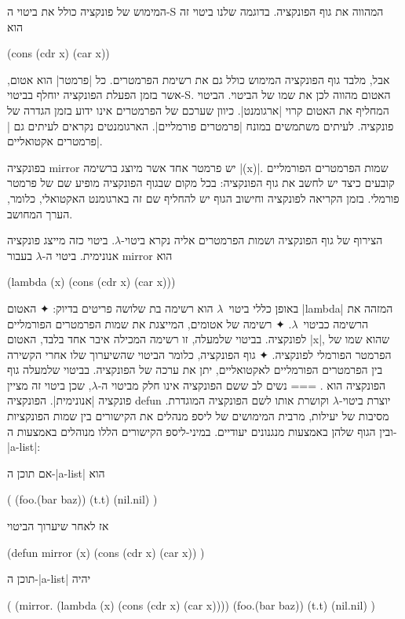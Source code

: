 המימוש של פונקציה כולל את ביטוי ה-S המהווה את גוף הפונקציה. בדוגמה שלנו ביטוי
זה הוא
\begin{LISP}
(cons (cdr x) (car x))
\end{LISP}
אבל, מלבד גוף הפונקציה המימוש כולל גם את רשימת הפרמטרים. כל \ע|פרמטר|
הוא אטום, אשר בזמן הפעלת הפונקציה יוחלף בביטוי-S. האטום מהווה לכן את שמו של
הביטוי. הביטוי המחליף את האטום קרוי \ע|ארגומנט|. כיוון שערכם של הפרמטרים
אינו ידוע בזמן הגדרה של פונקציה. לעיתים משתמשים במונח \ע|פרמטרים פורמליים|.
הארגומנטים נקראים לעיתים גם \ע|פרמטרים אקטואליים|.

בפונקציה mirror יש פרמטר אחד אשר מיוצג ברשימה \T|(x)|. שמות הפרמטרים הפורמליים
קובעים כיצד יש לחשב את גוף הפונקציה: בכל מקום שבגוף הפונקציה מופיע שם של פרמטר
פורמלי. בזמן הקריאה לפונקציה וחישוב הגוף יש להחליף שם זה בארגומנט האקטואלי,
כלומר, הערך המחושב.

הצירוף של גוף הפונקציה ושמות הפרמטרים אליה נקרא ביטוי-$λ$. ביטוי כזה
מייצג פונקציה אנונימית. ביטוי ה-$λ$ בעבור mirror הוא
\begin{LISP}
  (lambda (x) (cons (cdr x) (car x)))
\end{LISP}

באופן כללי ביטוי~$λ$ הוא רשימה בת שלושה פריטים בדיוק:
✦ האטום \T|lambda| המזהה את הרשימה כביטוי~$λ$.
✦ רשימה של אטומים, המייצגת את שמות הפרמטרים הפורמליים לפונקציה.
בביטוי שלמעלה, זו רשימה המכילה איבר אחד בלבד, האטום \E|x|, שהוא שמו של הפרמטר הפורמלי לפונקציה.
✦ גוף הפונקציה, כלומר הביטוי שהשיערוך שלו אחרי הקשירה בין הפרמטרים
הפורמליים לאקטואליים, יתן את ערכה של הפונקציה. בביטוי שלמעלה גוף הפונקציה הוא
.
===
נשים לב ששם הפונקציה אינו חלק מביטוי ה-$λ$, שכן ביטוי זה מציין פונקציה
\ע|אנונימית|. הפונקציה defun יוצרת ביטוי-$λ$ וקושרת אותו לשם הפונקציה המוגדרת.
מסיבות של יעילות, מרבית המימושים של ליספ מנהלים את הקישורים בין שמות הפונקציות
ובין הגוף שלהן באמצעות מנגנונים יעודיים. במיני-ליספ הקישורים הללו מנוהלים
באמצעות ה-\E|a-list|:

אם תוכן ה-\E|a-list| הוא
\begin{LISP}
(
  (foo.(bar baz))
  (t.t)
  (nil.nil)
)
\end{LISP}
אז לאחר שיערוך הביטוי
\begin{LISP}
(defun mirror (x)
  (cons (cdr x) (car x))
)
\end{LISP}
תוכן ה-\E|a-list| יהיה
\begin{LISP}
(
  (mirror.
     (lambda (x)
        (cons (cdr x) (car x))))
  (foo.(bar baz))
  (t.t)
  (nil.nil)
)
\end{LISP}

